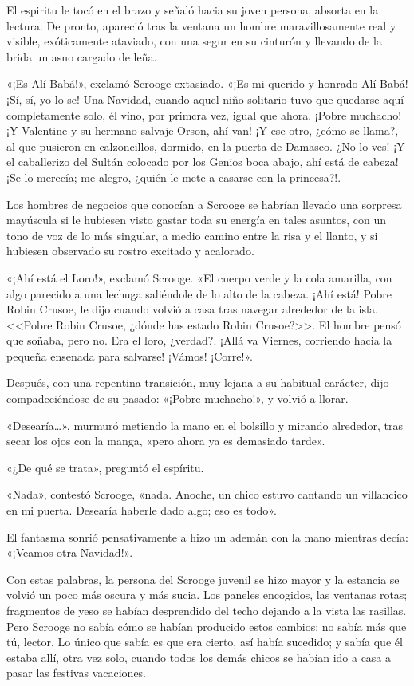 \documentclass{novela}
\begin{document}
 El espiritu le tocó en el brazo y señaló hacia su joven persona, absorta en la lectura. De pronto, apareció tras la ventana un hombre maravillosamente real y visible, exóticamente ataviado, con una segur en su cinturón y llevando de la brida un asno cargado de leña.

 «¡Es Alí Babá!», exclamó Scrooge extasiado. «¡Es mi querido y honrado Alí Babá! ¡Sí, sí, yo lo se! Una Navidad, cuando aquel niño solitario tuvo que quedarse aquí completamente solo, él vino, por primcra vez, igual que ahora. ¡Pobre muchacho! ¡Y Valentine y su hermano salvaje Orson, ahí van! ¡Y ese otro, ¿cómo se llama?, al que pusieron en calzoncillos, dormido, en la puerta de Damasco. ¿No lo ves! ¡Y el caballerizo del Sultán colocado por los Genios boca abajo, ahí está de cabeza! ¡Se lo merecía; me alegro, ¿quién le mete a casarse con la princesa?!.

 Los hombres de negocios que conocían a Scrooge se habrían llevado una sorpresa mayúscula si le hubiesen visto gastar toda su energía en tales asuntos, con un tono de voz de lo más singular, a medio camino entre la risa y el llanto, y si hubiesen observado su rostro excitado y acalorado.

 «¡Ahí está el Loro!», exclamó Scrooge. «El cuerpo verde y la cola amarilla, con algo parecido a una lechuga saliéndole de lo alto de la cabeza. ¡Ahí está! Pobre Robin Crusoe, le dijo cuando volvió a casa tras navegar alrededor de la isla. <<Pobre Robin Crusoe, ¿dónde has estado Robin Crusoe?>>. El hombre pensó que soñaba, pero no. Era el loro, ¿verdad?. ¡Allá va Viernes, corriendo hacia la pequeña ensenada para salvarse! ¡Vámos! ¡Corre!».

 Después, con una repentina transición, muy lejana a su habitual carácter, dijo compadeciéndose de su pasado: «¡Pobre muchacho!», y volvió a llorar.

 «Desearía{\ldots}», murmuró metiendo la mano en el bolsillo y mirando alrededor, tras secar los ojos con la manga, «pero ahora ya es demasiado tarde».

 «¿De qué se trata», preguntó el espíritu.

 «Nada», contestó Scrooge, «nada. Anoche, un chico estuvo cantando un villancico en mi puerta. Desearía haberle dado algo; eso es todo».

 El fantasma sonrió pensativamente a hizo un ademán con la mano mientras decía: «¡Veamos otra Navidad!».

 Con estas palabras, la persona del Scrooge juvenil se hizo mayor y la estancia se volvió un poco más oscura y más sucia. Los paneles encogidos, las ventanas rotas; fragmentos de yeso se habían desprendido del techo dejando a la vista las rasillas. Pero Scrooge no sabía cómo se habían producido estos cambios; no sabía más que tú, lector. Lo único que sabía es que era cierto, así había sucedido; y sabía que él estaba allí, otra vez solo, cuando todos los demás chicos se habían ido a casa a pasar las festivas vacaciones.
\end{document}
